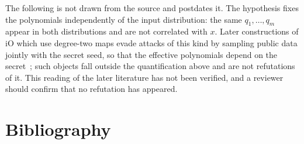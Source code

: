 \documentclass{aicr-conjecture}
\begin{document}
\begin{remark}\label{rem:scope}
The following is not drawn from the source and postdates it. The
hypothesis fixes the polynomials independently of the input
distribution: the same $q_1, \dots, q_m$ appear in both distributions
and are not correlated with $x$. Later constructions of iO which use
degree-two maps evade attacks of this kind by sampling public data
jointly with the secret seed, so that the effective polynomials depend
on the secret~\cite{JLS}; such objects fall outside the quantification
above and are not refutations of it. This reading of the later
literature has not been verified, and a reviewer should confirm that no
refutation has appeared.
\end{remark}

\section{Bibliography}
\end{document}
